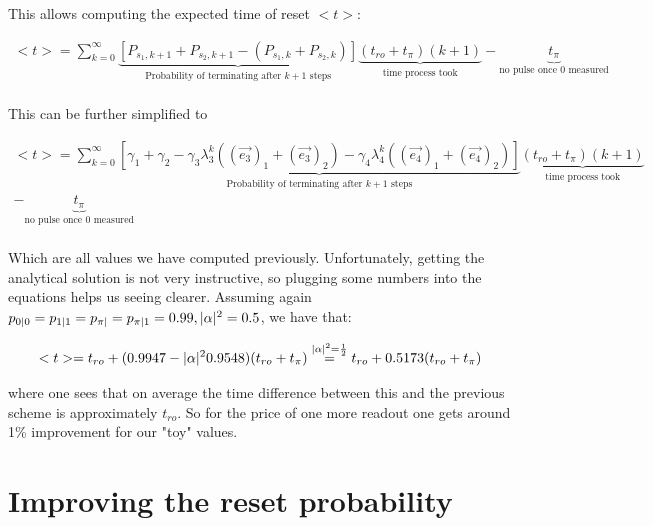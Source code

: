 This allows computing the expected time of reset $<t>$: 

\begin{equation}
\begin{split}
    < t > = \sum_{k = 0 }^\infty \underbrace{\left[P_{s_1,k+1} + P_{s_2,k+1} - (P_{s_1,k} + P_{s_2,k})\right]}_{\text{Probability of terminating after } k+1 \text{ steps}}\underbrace{(t_{ro} + t_\pi)(k+1)}_{\text{time process took}} - \underbrace{t_{\pi}}_{\text{no pulse once 0 measured}}\\ 
\end{split}
\end{equation}

This can be further simplified to 

\begin{equation}
\begin{split}
    < t > = \sum_{k = 0 }^\infty \underbrace{\left[\gamma_1 + \gamma_2 - \gamma_3\lambda_3^k((\vec{e_3})_1 + (\vec{e_3})_2) - \gamma_4\lambda_4^k((\vec{e_4})_1 + (\vec{e_4})_2) \right]}_{\text{Probability of terminating after } k+1 \text{ steps}}\underbrace{(t_{ro} + t_\pi)(k+1)}_{\text{time process took}} \\
    - \underbrace{t_{\pi}}_{\text{no pulse once 0 measured}}\\ 
\end{split}
\end{equation}

Which are all values we have computed previously. Unfortunately, getting the analytical solution is not very instructive, so plugging some numbers into the equations helps us seeing clearer. Assuming again $p_{0|0} = p_{1|1} = p_{\pi|} = p_{\pi|1} = 0.99, \lvert \alpha \rvert^2  = 0.5$, we have that: 

\begin{equation}
    <t> = t_{ro} + (0.9947 - \lvert \alpha \rvert^2 0.9548) (t_{ro} + t_\pi) \overset{\lvert \alpha \rvert^2 = \frac{1}{2}}{=} t_{ro} + 0.5173(t_{ro} + t_\pi)
\end{equation}

where one sees that on average the time difference between this and the previous scheme is approximately $t_{ro}$. So for the price of one more readout one gets around 1\% improvement for our "toy" values.  





\section{Improving the reset probability} \label{sec:double_readout}

